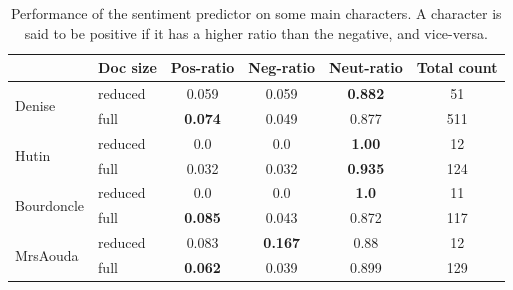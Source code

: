 \begin{table}
\centering
\begin{tabular}{| l | l || *{4}{c|}}
\hline
& Doc size & Pos-ratio & Neg-ratio	& Neut-ratio & Total count	\\ \hline \hline
\multirow{2}{*}{Denise} & reduced & 0.059 & 0.059 & \bf 0.882 & 51 \\ \cline{2-6}
& full & \bf 0.074 & 0.049 & 0.877	& 511 	\\ \hline

\multirow{2}{*}{Hutin} & reduced	& 0.0	& 0.0	& \bf 1.00	& 12 \\ \cline{2-6}
	& full & 0.032 & 0.032 & \bf 0.935	&  124	\\ \hline
    
\multirow{2}{*}{Bourdoncle}	& reduced & 0.0	& 0.0	& \bf 1.0	& 11 \\ \cline{2-6}
	& full & \bf 0.085 & 0.043 & 0.872 & 117 \\ \hline
    
\multirow{2}{*}{MrsAouda} & reduced	& 0.083	& \bf 0.167	&  0.88 & 12 \\ \cline{2-6}
	& full & \bf 0.062 & 0.039 & 0.899	& 129 	\\ \hline

\end{tabular}
\caption{Performance of the sentiment predictor on some main characters. A character is said to be positive if it has a higher ratio than the negative, and vice-versa.}
\label{tab:full_vs_red}
\end{table}

\vspace{3em}

